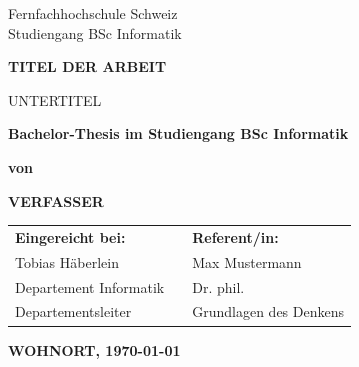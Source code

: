 \begin{titlepage}


    \begin{minipage}[t]{0.5\textwidth}\vspace{0pt}
        
    \end{minipage}
    \begin{minipage}[t]{0.43\textwidth}\vspace{2.3pt}
        \begin{flushright}
            Fernfachhochschule Schweiz\\
            Studiengang BSc Informatik\\
        \end{flushright}
    \end{minipage}
    \begin{center}
    
        \vfill
            
        \Huge
        \textbf{TITEL DER ARBEIT}
            
        \vspace{0.5cm}
        \LARGE
        UNTERTITEL
            
        \vfill
                        
        \textbf{Bachelor-Thesis im Studiengang BSc Informatik}
        
        \vspace{0.5cm}
        \textbf{von}
        \vspace{0.5cm}
                
        \textbf{VERFASSER}
            
        \vspace{2cm}
        \normalsize
               
        \begin{tabularx}{0.7\textwidth}{@{}l C l@{}} 
            \textbf{Eingereicht bei:}  & & \textbf{Referent/in:} \\ 
            Tobias Häberlein           & & Max Mustermann \\
            Departement Informatik     & & Dr. phil. \\
            Departementsleiter         & & Grundlagen des Denkens \\
        \end{tabularx}
                
        \vspace{2cm}
            
            
        \textbf{WOHNORT, \today}
        
    \end{center}
\end{titlepage}